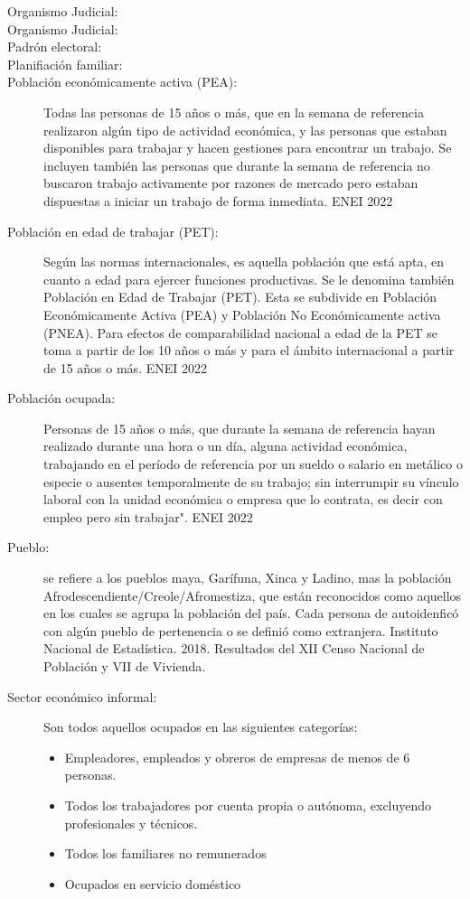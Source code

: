 \begin{description}
	\item[Organismo Judicial:] 
	\item[Organismo Judicial:] 
	\item[Padrón electoral:] 
	\item[Planifiación familiar:] 
	\item[Población económicamente activa (PEA):] Todas las personas de 15 años o más, que en la semana de referencia realizaron algún tipo de actividad económica, y las personas que estaban disponibles para trabajar y hacen gestiones para encontrar un trabajo. Se incluyen también las personas que durante la semana de referencia no buscaron trabajo activamente por razones de mercado pero estaban dispuestas a iniciar un trabajo de forma inmediata. ENEI 2022
	\item[Población en edad de trabajar (PET):] Según las normas internacionales, es aquella población que está apta, en cuanto a edad para ejercer funciones productivas. Se le denomina también Población en Edad de Trabajar (PET). Esta se subdivide en Población Económicamente Activa (PEA) y Población No Económicamente activa (PNEA). Para efectos de comparabilidad nacional a edad de la PET se toma a partir de los 10 años o más y para el ámbito internacional a partir de 15 años o más. ENEI 2022
	\item[Población ocupada:] Personas de 15 años o más, que durante la semana de referencia hayan realizado durante una hora o un día, alguna actividad económica, trabajando en el período de referencia por un sueldo o salario en metálico o especie o ausentes temporalmente de su trabajo; sin interrumpir su vínculo laboral con la unidad económica o empresa que lo contrata, es decir con empleo pero sin trabajar". ENEI 2022
 	\item[Pueblo:] se refiere a los pueblos maya, Garífuna, Xinca y Ladino, mas la población Afrodescendiente/Creole/Afromestiza, que están reconocidos como aquellos en los cuales se agrupa la población del país. Cada persona de autoidenficó con algún pueblo de pertenencia o se definió como extranjera. Instituto Nacional de Estadística. 2018. Resultados del XII Censo Nacional de Población y VII de Vivienda.
	\item[Sector económico informal:] Son todos aquellos ocupados en las siguientes categorías:
	\begin{itemize}\itemsep -1pt
		\item	Empleadores, empleados y obreros de empresas de menos de 6 personas.
		\item	Todos los trabajadores por cuenta propia o autónoma, excluyendo profesionales y técnicos. 
		\item	Todos los familiares no remunerados
		\item	Ocupados en servicio doméstico
	\end{itemize}
	

\end{description}
